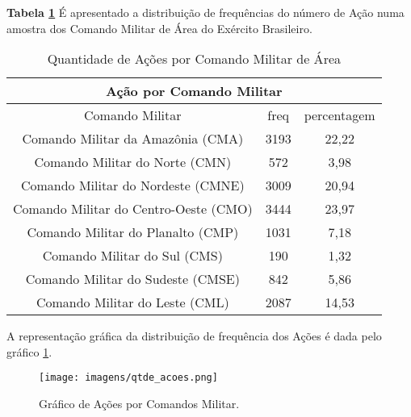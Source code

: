 \hspace{1.5cm}
\textbf{Tabela \ref{QuantidadeAcoes}} É apresentado a distribuição de frequências do número de Ação numa amostra dos Comando Militar de Área do Exército Brasileiro. 
\begin{table}[H]
\centering
\begin{tabular}{|c | c| c|} 
 \multicolumn{3}{c}{Ação por Comando Militar}\\ \hline
  Comando Militar & freq   & percentagem \\ [0.5ex] 
 \hline
 Comando Militar da Amazônia (CMA) &  3193 & 22,22\\ 
 \hline
 Comando Militar do Norte (CMN) &  572 & 3,98\\
 \hline
 Comando Militar do Nordeste (CMNE) &  3009 & 20,94\\
 \hline
 Comando Militar do Centro-Oeste (CMO) &  3444 & 23,97\\
 \hline
 Comando Militar do Planalto (CMP) &  1031 & 7,18\\
 \hline
 Comando Militar do Sul (CMS) &  190 & 1,32\\
 \hline
 Comando Militar do Sudeste (CMSE) &  842 & 5,86\\
 \hline
 Comando Militar do Leste (CML) &  2087 & 14,53\\ [1ex] 
 \hline
\end{tabular}
\caption{Quantidade de Ações por Comando Militar de Área}
\label{QuantidadeAcoes}
\end{table}

\hspace{1.5cm}
A representação gráfica da distribuição de frequência dos Ações é dada pelo gráfico \ref{figuraAcoes}.
\begin{figure}[H]
        \centering
        \texttt{[image: imagens/qtde\_acoes.png]}
        \caption{Gráfico de Ações por Comandos Militar.}
        \label{figuraAcoes}
\end{figure}

